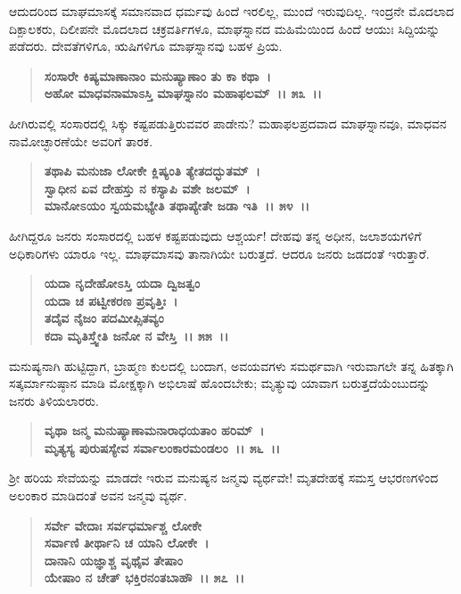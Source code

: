 ಆದುದರಿಂದ ಮಾಘಮಾಸಕ್ಕೆ ಸಮಾನವಾದ ಧರ್ಮವು ಹಿಂದೆ ಇರಲಿಲ್ಲ, ಮುಂದೆ ಇರುವುದಿಲ್ಲ. ಇಂದ್ರನೇ ಮೊದಲಾದ ದಿಕ್ಪಾಲಕರು, ದಿಲೀಪನೇ ಮೊದಲಾದ ಚಕ್ರವರ್ತಿಗಳೂ, ಮಾಘಸ್ನಾನದ ಮಹಿಮೆಯಿಂದ ಹಿಂದೆ ಆಯುಃ ಸಿದ್ದಿಯನ್ನು ಪಡೆದರು. ದೇವತೆಗಳಿಗೂ, ಋಷಿಗಳಿಗೂ ಮಾಘಸ್ನಾನವು ಬಹಳ ಪ್ರಿಯ.

\begin{verse}
\textbf{ಸಂಸಾರೇ ಕಿಷ್ಯಮಾಣಾನಾಂ ಮನುಷ್ಯಾಣಾಂ ತು ಕಾ ಕಥಾ~।}\\\textbf{ಅಹೋ ಮಾಧವನಾಮಾಽಸ್ತಿ ಮಾಘಸ್ನಾನಂ ಮಹಾಫಲಮ್~।। ೫೩~।।}
\end{verse}

ಹೀಗಿರುವಲ್ಲಿ ಸಂಸಾರದಲ್ಲಿ ಸಿಕ್ಕು ಕಷ್ಟಪಡುತ್ತಿರುವವರ ಪಾಡೇನು? ಮಹಾಫಲಪ್ರದವಾದ ಮಾಘಸ್ನಾನವೂ, ಮಾಧವನ ನಾಮೋಚ್ಛಾರಣೆಯೇ ಅವರಿಗೆ ತಾರಕ.

\begin{verse}
\textbf{ತಥಾಪಿ ಮನುಜಾ ಲೋಕೇ ಕ್ಲಿಷ್ಯಂತಿ ತ್ಯೇತದದ್ಭುತಮ್~।}\\\textbf{ಸ್ವಾಧೀನ ಏವ ದೇಹಸ್ತು ನ ಕಸ್ಯಾಪಿ ವಶೇ ಜಲಮ್~।}\\\textbf{ಮಾನೋಽಯಂ ಸ್ವಯಮಭ್ಯೇತಿ ತಥಾಪ್ಯೇತೇ ಜಡಾ ಇತಿ~।। ೫೪~।।}
\end{verse}

ಹೀಗಿದ್ದರೂ ಜನರು ಸಂಸಾರದಲ್ಲಿ ಬಹಳ ಕಷ್ಟಪಡುವುದು ಆಶ್ಚರ್ಯ! ದೇಹವು ತನ್ನ ಅಧೀನ, ಜಲಾಶಯಗಳಿಗೆ ಅಧಿಕಾರಿಗಳು ಯಾರೂ ಇಲ್ಲ. ಮಾಘಮಾಸವು ತಾನಾಗಿಯೇ ಬರುತ್ತದೆ. ಆದರೂ ಜನರು ಜಡದಂತೆ ಇರುತ್ತಾರೆ.

\begin{verse}
\textbf{ಯದಾ ನೃದೇಹೋಽಸ್ತಿ ಯದಾ ದ್ವಿಜತ್ವಂ}\\\textbf{ಯದಾ ಚ ಪಟ್ವೀಕರಣ ಪ್ರವೃತ್ತಿಃ~।}\\\textbf{ತದೈವ ನೈಜಂ ಪದಮೀಪ್ಸಿತವ್ಯಂ }\\\textbf{ಕದಾ ಮೃತಿಸ್ತ್ವೇತಿ ಜನೋ ನ ವೇಸ್ತಿ~।। ೫೫~।।}
\end{verse}

ಮನುಷ್ಯನಾಗಿ ಹುಟ್ಟಿದ್ದಾಗ, ಬ್ರಾಹ್ಮಣ ಕುಲದಲ್ಲಿ ಬಂದಾಗ, ಅವಯವಗಳು ಸಮರ್ಥ\-ವಾಗಿ ಇರುವಾಗಲೇ ತನ್ನ ಹಿತಕ್ಕಾಗಿ ಸತ್ಕರ್ಮಾನುಷ್ಠಾನ ಮಾಡಿ ಮೋಕ್ಷಕ್ಕಾಗಿ ಅಭಿಲಾಷೆ ಹೊಂದಬೇಕು; ಮೃತ್ಯುವು ಯಾವಾಗ ಬರುತ್ತದೆಯೆಂಬುದನ್ನು ಜನರು ತಿಳಿಯಲಾರರು.

\begin{verse}
\textbf{ವೃಥಾ ಜನ್ಮ ಮನುಷ್ಯಾಣಾಮನಾರಾಧಯತಾಂ ಹರಿಮ್~।}\\\textbf{ಮೃತ್ಯಸ್ಯ ಪುರುಷಸ್ಯೇವ ಸರ್ವಾಲಂಕಾರಮಂಡಲಂ~।। ೫೬~।।}
\end{verse}

ಶ‍್ರೀ ಹರಿಯ ಸೇವೆಯನ್ನು ಮಾಡದೇ ಇರುವ ಮನುಷ್ಯನ ಜನ್ಮವು ವ್ಯರ್ಥವೇ! ಮೃತ\-ದೇಹಕ್ಕೆ ಸಮಸ್ತ ಆಭರಣಗಳಿಂದ ಅಲಂಕಾರ ಮಾಡಿದಂತೆ ಅವನ ಜನ್ಮವು ವ್ಯರ್ಥ.

\begin{verse}
\textbf{ಸರ್ವೇ ವೇದಾಃ ಸರ್ವಧರ್ಮಾಶ್ಚ ಲೋಕೇ}\\\textbf{ಸರ್ವಾಣಿ ತೀರ್ಥಾನಿ ಚ ಯಾನಿ ಲೋಕೇ~।}\\\textbf{ದಾನಾನಿ ಯಜ್ಞಾಶ್ಚ ವೃಥೈವ ತೇಷಾಂ}\\\textbf{ಯೇಷಾಂ ನ ಚೇತ್ ಭಕ್ತಿರನಂತಬಾಹೌ~।। ೫೭~।।}
\end{verse}

